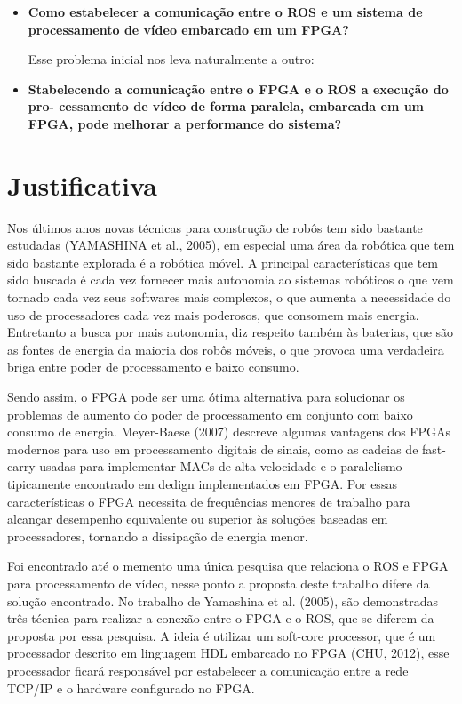 \begin{itemize}
    \item \textbf{Como estabelecer a comunicação entre o ROS e um sistema de processamento de vídeo 
embarcado em um FPGA?}


Esse problema inicial nos leva naturalmente a outro:


    \item \textbf{Stabelecendo a comunicação entre o FPGA e o ROS a execução do pro-
cessamento de vídeo de forma paralela, embarcada em um FPGA, pode
melhorar a performance do sistema?}
  
\end{itemize}







\section{Justificativa}

Nos últimos anos novas técnicas para construção de robôs tem sido bastante
estudadas (YAMASHINA et al., 2005), em especial uma área da robótica que tem sido
bastante explorada é a robótica móvel. A principal características que tem sido buscada é
cada vez fornecer mais autonomia ao sistemas robóticos o que vem tornado cada vez seus
softwares mais complexos, o que aumenta a necessidade do uso de processadores cada vez
mais poderosos, que consomem mais energia. Entretanto a busca por mais autonomia, diz
respeito também às baterias, que são as fontes de energia da maioria dos robôs móveis, o
que provoca uma verdadeira briga entre poder de processamento e baixo consumo.

Sendo assim, o FPGA pode ser uma ótima alternativa para solucionar os problemas
de aumento do poder de processamento em conjunto com baixo consumo de energia.
Meyer-Baese (2007) descreve algumas vantagens dos FPGAs modernos para uso em
processamento digitais de sinais, como as cadeias de fast-carry usadas para implementar
MACs de alta velocidade e o paralelismo tipicamente encontrado em dedign implementados
em FPGA. Por essas características o FPGA necessita de frequências menores de trabalho
para alcançar desempenho equivalente ou superior às soluções baseadas em processadores,
tornando a dissipação de energia menor.

Foi encontrado até o memento uma única pesquisa que relaciona o ROS e FPGA
para processamento de vídeo, nesse ponto a proposta deste trabalho difere da solução
encontrado. No trabalho de Yamashina et al. (2005), são demonstradas três técnica para
realizar a conexão entre o FPGA e o ROS, que se diferem da proposta por essa pesquisa. A
ideia é utilizar um soft-core processor, que é um processador descrito em linguagem HDL
embarcado no FPGA (CHU, 2012), esse processador ficará responsável por estabelecer a
comunicação entre a rede TCP/IP e o hardware configurado no FPGA.

